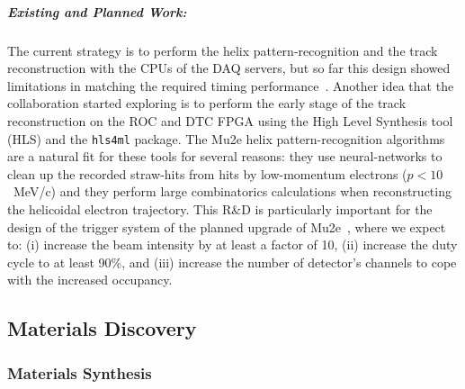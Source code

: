 \subparagraph*{Existing and Planned Work:} The current strategy is to perform the helix pattern-recognition and the track reconstruction with the CPUs of the DAQ servers, but so far this design showed limitations in matching the required timing performance~\cite{pezzullo_gianantonio_2020_4088480}. 
Another idea that the collaboration started exploring is to perform the early stage of the track reconstruction on the ROC and DTC FPGA using the High Level Synthesis tool (HLS) and the \texttt{hls4ml} package. 
The Mu2e helix pattern-recognition algorithms~\cite{pezzullo_gianantonio_2020_4088480} are a natural fit for these tools for several reasons: they use neural-networks to clean up the recorded straw-hits from hits by low-momentum electrons ($p<10$~MeV/c) and they perform large combinatorics calculations when reconstructing the helicoidal electron trajectory. 
This R\&D is particularly important for the design of the trigger system of the planned upgrade of Mu2e~\cite{abusalma2018expression}, where we expect to: (i) increase the beam intensity by at least a factor of 10, (ii) increase the duty cycle to at least 90\%, and (iii) increase the number of detector's channels to cope with the increased occupancy.


\subsection{Materials Discovery}
\subsubsection{Materials Synthesis}

